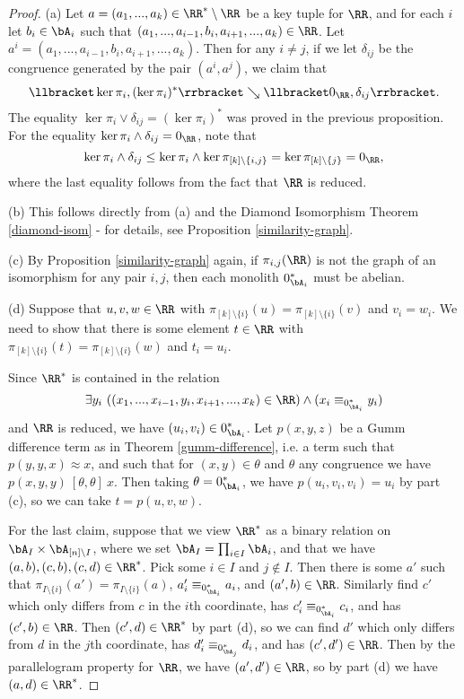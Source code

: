 \begin{proof} (a) Let $a = (a_1, ..., a_k) \in \RR^*\setminus \RR$ be a key tuple for $\RR$, and for each $i$ let $b_i \in \bA_i$ such that $(a_1, ..., a_{i-1}, b_i, a_{i+1}, ..., a_k) \in \RR$. Let $a^i = (a_1, ..., a_{i-1}, b_i, a_{i+1}, ..., a_k)$. Then for any $i \ne j$, if we let $\delta_{ij}$ be the congruence generated by the pair $(a^i, a^j)$, we claim that
\[
\llbracket \ker \pi_i, (\ker \pi_i)^* \rrbracket \searrow \llbracket 0_\RR, \delta_{ij} \rrbracket.
\]
The equality $\ker \pi_i \vee \delta_{ij} = (\ker \pi_i)^*$ was proved in the previous proposition. For the equality $\ker \pi_i \wedge \delta_{ij} = 0_\RR$, note that
\[
\ker \pi_i \wedge \delta_{ij} \le \ker \pi_i \wedge \ker \pi_{[k]\setminus\{i,j\}} = \ker \pi_{[k]\setminus \{j\}} = 0_\RR,
\]
where the last equality follows from the fact that $\RR$ is reduced.

(b) This follows directly from (a) and the Diamond Isomorphism Theorem \ref{diamond-isom} - for details, see Proposition \ref{similarity-graph}.

(c) By Proposition \ref{similarity-graph} again, if $\pi_{i,j}(\RR)$ is not the graph of an isomorphism for any pair $i,j$, then each monolith $0_{\bA_i}^*$ must be abelian.

(d) Suppose that $u,v,w \in \RR$ with $\pi_{[k]\setminus\{i\}}(u) = \pi_{[k]\setminus \{i\}}(v)$ and $v_i = w_i$. We need to show that there is some element $t \in \RR$ with $\pi_{[k]\setminus\{i\}}(t) = \pi_{[k]\setminus\{i\}}(w)$ and $t_i = u_i$.

Since $\RR^*$ is contained in the relation
\[
\exists y_i\ ((x_1, ..., x_{i-1}, y_i, x_{i+1}, ..., x_k) \in \RR) \wedge (x_i \equiv_{0_{\bA_i}^*} y_i)
\]
and $\RR$ is reduced, we have $(u_i,v_i) \in 0_{\bA_i}^*$. Let $p(x,y,z)$ be a Gumm difference term as in Theorem \ref{gumm-difference}, i.e. a term such that $p(y,y,x) \approx x$, and such that for $(x,y) \in \theta$ and $\theta$ any congruence we have $p(x,y,y)\ [\theta, \theta]\ x$. Then taking $\theta = 0_{\bA_i}^*$, we have $p(u_i,v_i,v_i) = u_i$ by part (c), so we can take $t = p(u,v,w)$.

For the last claim, suppose that we view $\RR^*$ as a binary relation on $\bA_I \times \bA_{[n]\setminus I}$, where we set $\bA_I = \prod_{i \in I} \bA_i$, and that we have $(a,b), (c,b), (c,d) \in \RR^*$. Pick some $i \in I$ and $j \not\in I$. Then there is some $a'$ such that $\pi_{I\setminus\{i\}}(a') = \pi_{I\setminus\{i\}}(a)$, $a_i' \equiv_{0^*_{\bA_i}} a_i$, and $(a',b) \in \RR$. Similarly find $c'$ which only differs from $c$ in the $i$th coordinate, has $c_i' \equiv_{0^*_{\bA_i}} c_i$, and has $(c',b) \in \RR$. Then $(c',d) \in \RR^*$ by part (d), so we can find $d'$ which only differs from $d$ in the $j$th coordinate, has $d_i' \equiv_{0^*_{\bA_j}} d_i$, and has $(c',d') \in \RR$. Then by the parallelogram property for $\RR$, we have $(a',d') \in \RR$, so by part (d) we have $(a,d) \in \RR^*$.
\end{proof}

